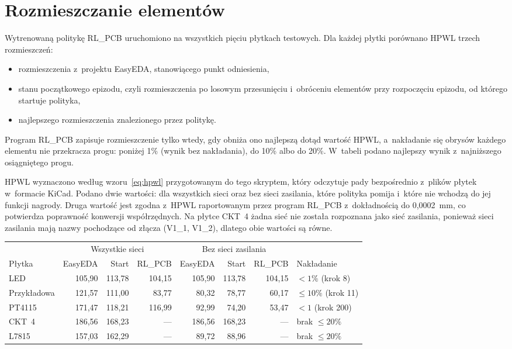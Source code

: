 \section{Rozmieszczanie elementów}
\label{sec:wyniki-rozmieszczanie}

Wytrenowaną politykę RL\_PCB uruchomiono na wszystkich pięciu płytkach
testowych. Dla każdej płytki porównano HPWL trzech rozmieszczeń:
\begin{itemize}
  \item rozmieszczenia z~projektu EasyEDA, stanowiącego punkt odniesienia,
  \item stanu początkowego epizodu, czyli rozmieszczenia po losowym
    przesunięciu i~obróceniu elementów przy rozpoczęciu epizodu, od którego
    startuje polityka,
  \item najlepszego rozmieszczenia znalezionego przez politykę.
\end{itemize}
Program RL\_PCB zapisuje rozmieszczenie tylko wtedy, gdy obniża ono
najlepszą dotąd wartość HPWL, a~nakładanie się obrysów każdego elementu
nie przekracza progu: poniżej 1\% (wynik bez nakładania), do 10\% albo do
20\%. W~tabeli podano najlepszy wynik z~najniższego osiągniętego progu.

HPWL wyznaczono według wzoru~\ref{eq:hpwl} przygotowanym do tego skryptem, 
który odczytuje pady bezpośrednio z~plików
płytek w~formacie KiCad. Podano dwie wartości:
dla wszystkich sieci oraz bez sieci zasilania, które polityka pomija
i~które nie wchodzą do jej funkcji nagrody. Druga wartość jest zgodna
z~HPWL raportowanym przez program RL\_PCB z~dokładnością do
0,0002~mm, co potwierdza poprawność konwersji współrzędnych. Na płytce
CKT~4 żadna sieć nie została rozpoznana jako sieć zasilania, ponieważ
sieci zasilania mają nazwy pochodzące od złącza (V1\_1, V1\_2), dlatego
obie wartości są równe.

\begin{table}[ht]
\label{tab:wyniki-hpwl}
\centering\footnotesize%
\begin{tabular}{l r r r r r r l}
\toprule
 & \multicolumn{3}{c}{Wszystkie sieci} & \multicolumn{3}{c}{Bez sieci zasilania} & \\
\cmidrule(lr){2-4}\cmidrule(lr){5-7}
Płytka & EasyEDA & Start & RL\_PCB & EasyEDA & Start & RL\_PCB & Nakładanie \\
\midrule
LED & 105,90 & 113,78 & 104,15 & 105,90 & 113,78 & 104,15 & $<1\%$ (krok 8) \\
\midrule
Przykładowa & 121,57 & 111,00 & 83,77 & 80,32 & 78,77 & 60,17 & $\le 10\%$ (krok 11) \\
\midrule
PT4115 & 171,47 & 118,21 & 116,99 & 92,99 & 74,20 & 53,47 & $<1$ (krok 200) \\
\midrule
CKT~4 & 186,56 & 168,23 & --- & 186,56 & 168,23 & --- & brak $\le 20\%$ \\
\midrule
L7815 & 157,03 & 162,29 & --- & 89,72 & 88,96 & --- & brak $\le 20\%$ \\
\bottomrule
\end{tabular}
\end{table}

